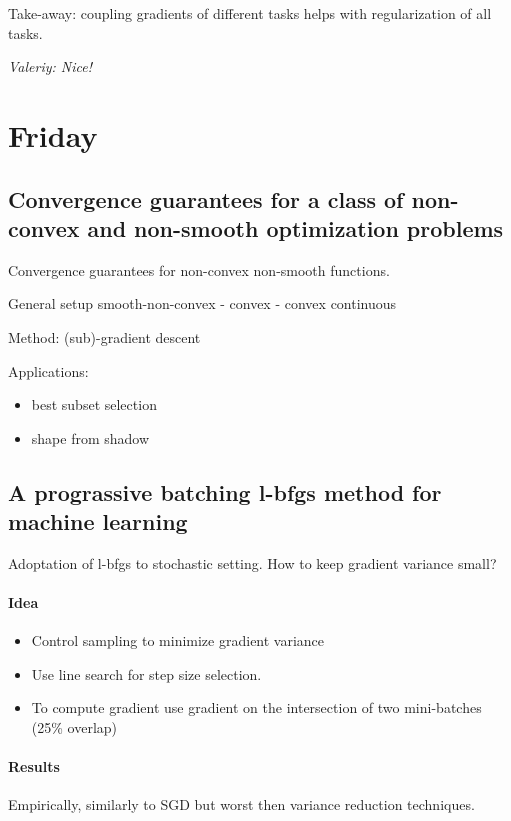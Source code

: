 \documentclass[11pt,oneside,a4paper]{scrartcl}
\newcommand{\valeriy}[1]{{\color{blue}\textit{Valeriy: #1}}}
\begin{document}
Take-away: coupling gradients of different tasks helps with
regularization of all tasks.

\valeriy{Nice!}

\section{Friday}
\label{sec:friday}

\subsection{Convergence guarantees for a class of non-convex and
  non-smooth optimization problems}

Convergence guarantees for non-convex non-smooth functions.

General setup smooth-non-convex - convex - convex continuous 

Method: (sub)-gradient descent

Applications:
\begin{itemize}
\item best subset selection
\item shape from shadow
\end{itemize}

\subsection{A prograssive batching l-bfgs method for machine learning}
\label{sec:progr-batch-l}

Adoptation of l-bfgs to stochastic setting. How to keep gradient
variance small?

\paragraph{Idea}

\begin{itemize}
\item Control sampling to minimize gradient variance 
\item Use line search for step size selection.
\item To compute gradient use gradient on the intersection of two
  mini-batches (25\% overlap)
\end{itemize}


\paragraph{Results}
Empirically, similarly to SGD but worst then variance reduction
techniques.
\end{document}
